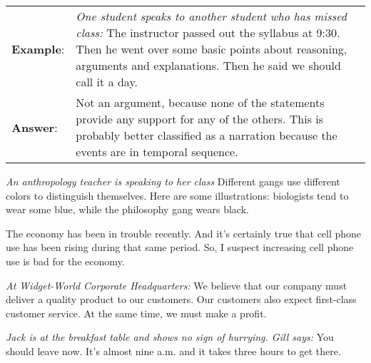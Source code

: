 \begin{longtabu}{p{.1\linewidth}p{.9\linewidth}}
\textbf{Example}: & \textit{One student speaks to another student who has missed class:} The instructor passed out the syllabus at 9:30. Then he went over some basic points about reasoning, arguments and explanations. Then he said we should call it a day. \\
\textbf{Answer}: & Not an argument, because none of the statements provide any support for any of the others. This is probably better classified as a narration because the events are in temporal sequence. \\
\end{longtabu}

\begin{exercises}
\item \textit{An anthropology teacher is speaking to her class }Different gangs use different colors to distinguish themselves. Here are some illustrations: biologists tend to wear some blue, while the philosophy gang wears black. 

\item The economy has been in trouble recently. And it's certainly true that cell phone use has been rising during that same period. So, I suspect increasing cell phone use is bad for the economy. 


\item \textit{At Widget-World Corporate Headquarters:} We believe that our company must deliver a quality product to our customers. Our customers also expect first-class customer service. At the same time, we must make a profit. 

      
\item \textit{Jack is at the breakfast table and shows no sign of hurrying. Gill says:} You should leave now. It's almost nine a.m. and it takes three hours to get there.


\end{exercises}
